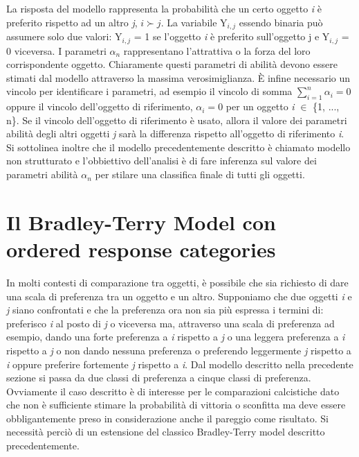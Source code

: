La risposta del modello rappresenta la probabilità che un certo oggetto \textit{i} è preferito rispetto ad un altro \textit{j}, $i \succ j$. La variabile Y$_{i,j}$ essendo binaria può assumere solo due valori: Y$_{i,j}$ = 1 se l'oggetto \textit{i} è preferito sull'oggetto j e Y$_{i,j}$ = 0 viceversa. I parametri $\alpha_{n}$ rappresentano l'attrattiva o la forza del loro corrispondente oggetto. Chiaramente questi parametri di abilità devono essere stimati dal modello attraverso la massima verosimiglianza. È infine necessario un vincolo per identificare i parametri, ad esempio il vincolo di somma $ \sum_{i=1}^{n} \alpha_{i} = 0 $ oppure il vincolo dell'oggetto di riferimento, $\alpha_{i} = 0$ per un oggetto \textit{i} $\in$ \{1, ..., n\}. Se il vincolo dell'oggetto di riferimento è usato, allora il valore dei parametri abilità degli altri oggetti \textit{j} sarà la differenza rispetto all'oggetto di riferimento \textit{i}.
\\

Si sottolinea inoltre che il modello precedentemente descritto è chiamato modello non strutturato e l'obbiettivo dell'analisi è di fare inferenza sul valore dei parametri abilità $\alpha_{n}$ per stilare una classifica finale di tutti gli oggetti.


\section{Il Bradley-Terry Model con ordered response categories}	
In molti contesti di comparazione tra oggetti, è possibile che sia richiesto di dare una scala di preferenza tra un oggetto e un altro. Supponiamo che due oggetti \textit{i} e \textit{j} siano confrontati e che la preferenza ora non sia più espressa i termini di: preferisco \textit{i} al posto di \textit{j} o viceversa ma, attraverso una scala di preferenza ad esempio, dando una forte preferenza a \textit{i} rispetto a \textit{j} o una leggera preferenza a \textit{i} rispetto a \textit{j} o non dando nessuna preferenza o preferendo leggermente \textit{j} rispetto a \textit{i} oppure preferire fortemente \textit{j} rispetto a \textit{i}. Dal modello descritto nella precedente sezione si passa da due classi di preferenza a cinque classi di preferenza.\\
Ovviamente il caso descritto è di interesse per le comparazioni calcistiche dato che non è sufficiente stimare la probabilità di vittoria o sconfitta ma deve essere obbligantemente preso in considerazione anche il pareggio come risultato. Si necessità perciò di un estensione del classico Bradley-Terry model descritto precedentemente.\\


